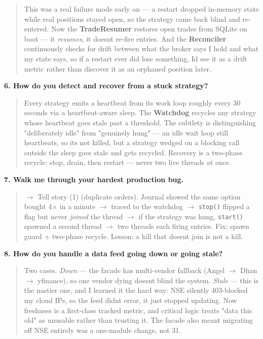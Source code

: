 \documentclass[11pt]{article}
\begin{document}
\begin{quote}
This was a real failure mode early on --- a restart dropped in-memory state while real positions
stayed open, so the strategy came back blind and re-entered. Now the \textbf{TradeResumer} restores
open trades from SQLite on boot --- it \emph{resumes}, it doesn\textquotesingle t re-fire entries. And the
\textbf{Reconciler} continuously checks for drift between what the broker says I hold and what my
state says, so if a restart ever did lose something, I\textquotesingle d see it as a drift metric rather than
discover it as an orphaned position later.
\end{quote}

\textbf{6. How do you detect and recover from a stuck strategy?}

\begin{quote}
Every strategy emits a heartbeat from its work loop roughly every 30 seconds via a
heartbeat-aware sleep. The \textbf{Watchdog} recycles any strategy whose heartbeat goes stale past a
threshold. The subtlety is distinguishing "deliberately idle" from "genuinely hung" --- an idle
wait loop still heartbeats, so it\textquotesingle s not killed, but a strategy wedged on a blocking call outside
the sleep goes stale and gets recycled. Recovery is a two-phase recycle: stop, drain, then
restart --- never two live threads at once.
\end{quote}

\textbf{7. Walk me through your hardest production bug.}

\begin{quote}
\(\rightarrow\) Tell story (1) (duplicate orders). Journal showed the same option bought 4\(\times\) in a minute \(\rightarrow\)
traced to the watchdog \(\rightarrow\) \texttt{stop()} flipped a flag but never \emph{joined} the thread \(\rightarrow\) if the
strategy was hung, \texttt{start()} spawned a second thread \(\rightarrow\) two threads each firing entries. Fix:
spawn guard + two-phase recycle. Lesson: a kill that doesn\textquotesingle t join is not a kill.
\end{quote}

\textbf{8. How do you handle a data feed going down or going stale?}

\begin{quote}
Two cases. \emph{Down} --- the facade has multi-vendor fallback (Angel \(\rightarrow\) Dhan \(\rightarrow\) yfinance), so one
vendor dying doesn\textquotesingle t blind the system. \emph{Stale} --- this is the nastier one, and I learned it the
hard way: NSE silently 403-blocked my cloud IPs, so the feed didn\textquotesingle t error, it just stopped
updating. Now freshness is a first-class tracked metric, and critical logic treats "data this
old" as unusable rather than trusting it. The facade also meant migrating off NSE entirely was
a one-module change, not 31.
\end{quote}
\end{document}
